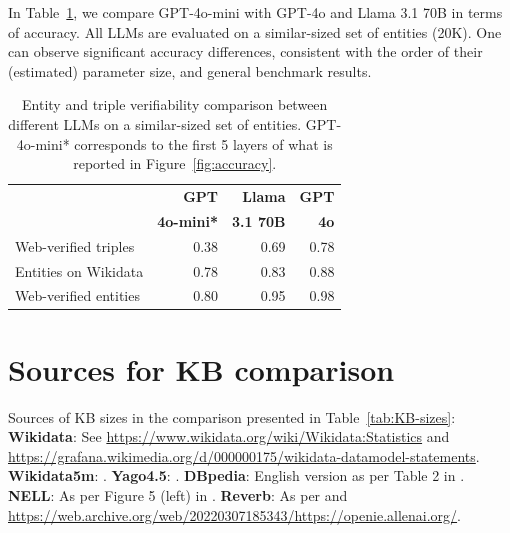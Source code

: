 In Table~\ref{tab:llm-comparison}, we compare GPT-4o-mini with GPT-4o and Llama 3.1 70B in terms of accuracy. All LLMs are evaluated on a similar-sized set of entities (20K). One can observe significant accuracy differences, consistent with the order of their (estimated) parameter size, and general benchmark results. 

\begin{table}[H]
\small
\centering
\begin{tabular}{@{}lrrr@{}}
    \toprule
     & \textbf{GPT} & \textbf{Llama} & \textbf{GPT} \\
     & \textbf{4o-mini*} & \textbf{3.1 70B} & \textbf{4o} \\
     \midrule
    Web-verified triples & 0.38 & 0.69 & 0.78 \\
    Entities on Wikidata & 0.78 & 0.83 & 0.88 \\
    Web-verified entities & 0.80 & 0.95 & 0.98 \\ 
    \bottomrule
\end{tabular}
\caption{Entity and triple verifiability comparison between different LLMs on a similar-sized set of entities. GPT-4o-mini* corresponds to the first 5 layers of what is reported in Figure~\ref{fig:accuracy}.}
\label{tab:llm-comparison}
\end{table}


\chapter{Sources for KB comparison}
\label{app:source-kb-sizes}
Sources of KB sizes in the comparison presented in Table~\ref{tab:KB-sizes}:
\textbf{Wikidata}: See \url{https://www.wikidata.org/wiki/Wikidata:Statistics} and \url{https://grafana.wikimedia.org/d/000000175/wikidata-datamodel-statements}.
\textbf{Wikidata5m}: \cite{wang-etal-2021-kepler}. 
\textbf{Yago4.5}: \cite{yago45}. 
\textbf{DBpedia}: English version as per Table 2 in \cite{dbpedia-statistics}. 
\textbf{NELL}: As per Figure 5 (left) in \cite{nell}. 
\textbf{Reverb}: As per \cite{reverb-linked} and \url{https://web.archive.org/web/20220307185343/https://openie.allenai.org/}.


